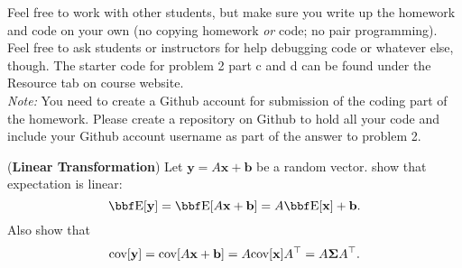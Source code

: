 \documentclass[12pt,letterpaper]{hmcpset}
\begin{document}
Feel free to work with other students, but make sure you write up the homework
and code on your own (no copying homework \textit{or} code; no pair programming).
Feel free to ask students or instructors for help debugging code or whatever else,
though.
The starter code for problem 2 part c and d can be found under the Resource tab on course website.\\

\textit{Note:} You need to create a Github account for submission of the coding part of the homework. Please create a repository on Github to hold all your code and include your Github account username as part of the answer to problem 2.

\begin{problem}[1]
(\textbf{Linear Transformation}) Let $\mathbf{y} = A\mathbf{x} + \mathbf{b}$ be a random vector.
show that expectation is linear:
\[
    \EE[\yy] = \EE[A\xx + \bb] = A\EE[\xx] + \bb.
\]
Also show that
\[
    {\hbox{cov}}[{\bf y}] = {\hbox{cov}}[A{\bf x} + {\bf b}] = A {\hbox{cov}}[{\bf x}] A^\top = A\hbox{\boldmath$\Sigma$} A^\top.
\]
\end{problem}
\end{document}
